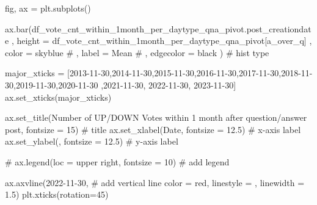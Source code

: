 \documentclass[
  letterpaper,
  DIV=11,
  numbers=noendperiod]{scrartcl}
\newenvironment{Shaded}{\begin{snugshade}}{\end{snugshade}}
\newcommand{\CommentTok}[1]{\textcolor[rgb]{0.37,0.37,0.37}{#1}}
\newcommand{\DecValTok}[1]{\textcolor[rgb]{0.68,0.00,0.00}{#1}}
\newcommand{\FloatTok}[1]{\textcolor[rgb]{0.68,0.00,0.00}{#1}}
\newcommand{\NormalTok}[1]{\textcolor[rgb]{0.00,0.23,0.31}{#1}}
\newcommand{\OperatorTok}[1]{\textcolor[rgb]{0.37,0.37,0.37}{#1}}
\newcommand{\StringTok}[1]{\textcolor[rgb]{0.13,0.47,0.30}{#1}}
\begin{document}
\begin{Shaded}
\begin{Highlighting}[]
\NormalTok{fig, ax }\OperatorTok{=}\NormalTok{ plt.subplots()}


\NormalTok{ax.bar(df\_vote\_cnt\_within\_1month\_per\_daytype\_qna\_pivot.post\_creationdate}
\NormalTok{    ,  height }\OperatorTok{=}\NormalTok{ df\_vote\_cnt\_within\_1month\_per\_daytype\_qna\_pivot[}\StringTok{\textquotesingle{}a\_over\_q\textquotesingle{}}\NormalTok{]}
\NormalTok{    ,  color }\OperatorTok{=} \StringTok{\textquotesingle{}skyblue\textquotesingle{}}
    \CommentTok{\# ,  label = \textquotesingle{}Mean\textquotesingle{}}
    \CommentTok{\# ,  edgecolor = \textquotesingle{}black\textquotesingle{}}
\NormalTok{      ) }\CommentTok{\# hist type}


\NormalTok{major\_xticks }\OperatorTok{=}\NormalTok{ [}\StringTok{\textquotesingle{}2013{-}11{-}30\textquotesingle{}}\NormalTok{,}\StringTok{\textquotesingle{}2014{-}11{-}30\textquotesingle{}}\NormalTok{,}\StringTok{\textquotesingle{}2015{-}11{-}30\textquotesingle{}}\NormalTok{,}\StringTok{\textquotesingle{}2016{-}11{-}30\textquotesingle{}}\NormalTok{,}\StringTok{\textquotesingle{}2017{-}11{-}30\textquotesingle{}}\NormalTok{,}\StringTok{\textquotesingle{}2018{-}11{-}30\textquotesingle{}}\NormalTok{,}\StringTok{\textquotesingle{}2019{-}11{-}30\textquotesingle{}}\NormalTok{,}\StringTok{\textquotesingle{}2020{-}11{-}30\textquotesingle{}}
\NormalTok{                ,}\StringTok{\textquotesingle{}2021{-}11{-}30\textquotesingle{}}\NormalTok{, }\StringTok{\textquotesingle{}2022{-}11{-}30\textquotesingle{}}\NormalTok{, }\StringTok{\textquotesingle{}2023{-}11{-}30\textquotesingle{}}\NormalTok{]}
\NormalTok{ax.set\_xticks(major\_xticks)}

\NormalTok{ax.set\_title(}\StringTok{\textquotesingle{}Number of UP/DOWN Votes within 1 month after question/answer post\textquotesingle{}}\NormalTok{, fontsize }\OperatorTok{=} \DecValTok{15}\NormalTok{) }\CommentTok{\# title}
\NormalTok{ax.set\_xlabel(}\StringTok{\textquotesingle{}Date\textquotesingle{}}\NormalTok{, fontsize }\OperatorTok{=} \FloatTok{12.5}\NormalTok{) }\CommentTok{\# x{-}axis label}
\NormalTok{ax.set\_ylabel(}\StringTok{\textquotesingle{}\textquotesingle{}}\NormalTok{, fontsize }\OperatorTok{=} \FloatTok{12.5}\NormalTok{) }\CommentTok{\# y{-}axis label}

\CommentTok{\# ax.legend(loc = \textquotesingle{}upper right\textquotesingle{}, fontsize = 10) \# add legend}

\NormalTok{ax.axvline(}\StringTok{\textquotesingle{}2022{-}11{-}30\textquotesingle{}}\NormalTok{, }\CommentTok{\# add vertical line}
\NormalTok{           color }\OperatorTok{=} \StringTok{\textquotesingle{}red\textquotesingle{}}\NormalTok{,}
\NormalTok{           linestyle }\OperatorTok{=} \StringTok{\textquotesingle{}{-}{-}\textquotesingle{}}\NormalTok{,}
\NormalTok{           linewidth }\OperatorTok{=} \FloatTok{1.5}\NormalTok{)}
\NormalTok{plt.xticks(rotation}\OperatorTok{=}\DecValTok{45}\NormalTok{)}


\end{Highlighting}
\end{Shaded}
\end{document}
